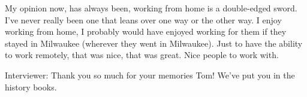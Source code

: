 My opinion now, has always been, working from home is a double-edged sword. I’ve never really been one that leans over one way or the other way. I enjoy working from home, I probably would have enjoyed working for them if they stayed in Milwaukee (wherever they went in Milwaukee). Just to have the ability to work remotely, that was nice, that was great. Nice people to work with.

\textcolor{interviewer}{Interviewer:} Thank you so much for your memories Tom! We’ve put you in the history books.
